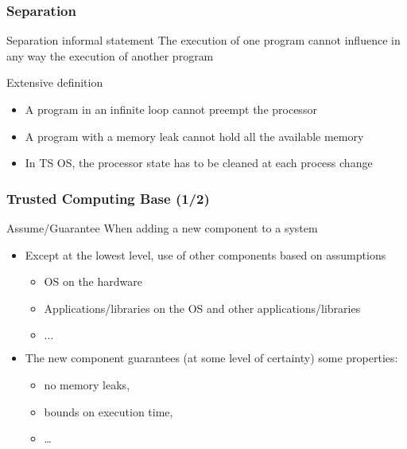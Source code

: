 \begin{reveals}
\begin{frame}
  \frametitle{Separation}

  \begin{block}{Separation informal statement}
    The execution of one program cannot influence in any way the
    execution of another program
  \end{block}

  \pause

  \begin{block}{Extensive definition}
    \begin{itemize}[<+->]
    \item A program in an infinite loop cannot preempt the processor
    \item A program with a memory leak cannot hold all the available memory
    \item In TS OS, the processor state has to be cleaned at each
      process change
    \end{itemize}
  \end{block}
\end{frame}

\begin{frame}
  \frametitle{Trusted Computing Base (1/2)}

  \begin{block}{Assume/Guarantee}
    When adding a new component to a system
    \begin{itemize}
    \item Except at the lowest level, use of other components based on assumptions  
      \begin{itemize}
      \item OS on the hardware
      \item Applications/libraries on the OS and other applications/libraries
      \item $\ldots$
      \end{itemize}
    \item The new component guarantees (at some level of certainty) some properties:
      \begin{itemize}
      \item no memory leaks,
      \item bounds on execution time,
      \item \ldots
      \end{itemize}
    \end{itemize}
  \end{block}
\end{frame}


\end{reveals}
